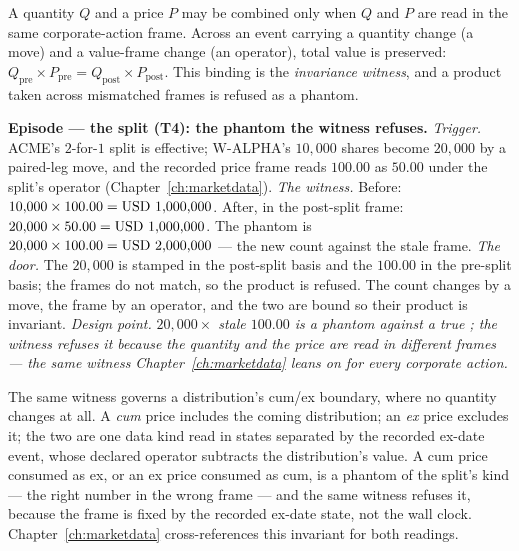\begin{invariant}\label{inv:consistency}
A quantity $Q$ and a price $P$ may be combined only when $Q$ and $P$ are read in
the same corporate-action frame. Across an event carrying a quantity change (a
move) and a value-frame change (an operator), total value is preserved:
$Q_{\text{pre}}\times P_{\text{pre}} = Q_{\text{post}}\times P_{\text{post}}$.
This binding is the \emph{invariance witness}, and a product taken across
mismatched frames is refused as a phantom.
\end{invariant}

\medskip\noindent\textbf{Episode --- the split (T4): the phantom the witness
refuses.}
\emph{Trigger.} ACME's $2$-for-$1$ split is effective; W-ALPHA's $10{,}000$
shares become $20{,}000$ by a paired-leg move, and the recorded price frame reads
$100.00$ as $50.00$ under the split's operator (Chapter~\ref{ch:marketdata}).
\emph{The witness.} Before: $10{,}000\times 100.00 = \mbox{USD~1{,}000{,}000}$. After,
in the post-split frame: $20{,}000\times 50.00 = \mbox{USD~1{,}000{,}000}$. The phantom
is $20{,}000\times 100.00 = \mbox{USD~2{,}000{,}000}$ --- the new count against the
stale frame. \emph{The door.} The $20{,}000$ is stamped in the post-split basis
and the $100.00$ in the pre-split basis; the frames do not match, so the product
is refused. The count changes by a move, the frame by an operator, and the two
are bound so their product is invariant.
\emph{Design point.} \emph{$20{,}000\times$ stale $100.00$ is a phantom
 against a true ; the witness refuses it
because the quantity and the price are read in different frames --- the same
witness Chapter~\ref{ch:marketdata} leans on for every corporate action.}

The same witness governs a distribution's cum/ex boundary, where no quantity
changes at all. A \emph{cum} price includes the coming distribution; an \emph{ex}
price excludes it; the two are one data kind read in states separated by the
recorded ex-date event, whose declared operator subtracts the distribution's
value. A cum price consumed as ex, or an ex price consumed as cum, is a phantom of
the split's kind --- the right number in the wrong frame --- and the same witness
refuses it, because the frame is fixed by the recorded ex-date state, not the wall
clock. Chapter~\ref{ch:marketdata} cross-references this invariant for both
readings.

